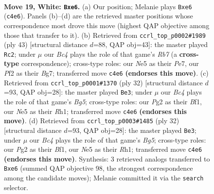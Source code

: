 \documentclass[11pt]{article}
\begin{document}
\clearpage

\begin{figure}[p]\centering
\begin{subfigure}{0.46\textwidth}\centering
\resizebox{\linewidth}{!}{%
\newchessgame
\chessboard[
  setfen={rn1r1k2/5pb1/2p1b3/4N1p1/p1B1nB1p/P7/RPP2PPP/1N2RK2 w - - 0 19},
  showmover=false,
  pgfstyle=straightmove, color=movearrow, markmove={c4-e6}
]}
\caption{}
\end{subfigure}\hfill
\begin{subfigure}{0.46\textwidth}\centering
\resizebox{\linewidth}{!}{%
\newchessgame
\chessboard[
  setfen={5rk1/4ppb1/p1npb2p/5P2/2p1P2B/2P5/Pr4P1/R1NNK2R b KQ - 1 22},
  showmover=false,
  pgfstyle=straightmove, color=movearrow, markmove={b2-c2}
]}
\caption{}
\end{subfigure}
\\[4pt]
\begin{subfigure}{0.46\textwidth}\centering
\resizebox{\linewidth}{!}{%
\newchessgame
\chessboard[
  setfen={r3k2r/1b1p2pp/p3p3/1p2n1B1/1b2P3/2N2P2/PPP3P1/2KR1B1R w kq - 1 17},
  showmover=false,
  pgfstyle=straightmove, color=movearrow, markmove={g5-e3}
]}
\caption{}
\end{subfigure}\hfill
\begin{subfigure}{0.46\textwidth}\centering
\resizebox{\linewidth}{!}{%
\newchessgame
\chessboard[
  setfen={r3k2r/1b1p2pp/p3p3/1p2n1B1/1b2P3/2N2P2/PPP3P1/2KR1B1R w kq - 1 17},
  showmover=false,
  pgfstyle=straightmove, color=movearrow, markmove={g5-e3}
]}
\caption{}
\end{subfigure}
\caption{\textbf{Move 19, White: \texttt{Bxe6}.} (a) Our position; Melanie plays \texttt{Bxe6} (\texttt{c4e6}). Panels (b)--(d) are the retrieved master positions whose correspondence most drove this move (highest QAP objective among those that transfer to it). (b) Retrieved from \texttt{ccrl\_top\_p0002\#1989} (ply 43) [structural distance $d$=88, QAP obj=43]: the master played \texttt{Rc2}; under $\mu$ our \emph{Bc4} plays the role of that game's \emph{Rb7} (a \textbf{cross-type} correspondence); cross-type roles: our \emph{N}e5 as their \emph{P}e7, our \emph{P}f2 as their \emph{B}g7; transferred move \texttt{c4e6} \textbf{(endorses this move)}. (c) Retrieved from \texttt{ccrl\_top\_p0001\#1370} (ply 32) [structural distance $d$=93, QAP obj=28]: the master played \texttt{Be3}; under $\mu$ our \emph{Bc4} plays the role of that game's \emph{Bg5}; cross-type roles: our \emph{P}g2 as their \emph{B}f1, our \emph{N}e5 as their \emph{R}h1; transferred move \texttt{c4e6} \textbf{(endorses this move)}. (d) Retrieved from \texttt{ccrl\_top\_p0003\#1485} (ply 32) [structural distance $d$=93, QAP obj=28]: the master played \texttt{Be3}; under $\mu$ our \emph{Bc4} plays the role of that game's \emph{Bg5}; cross-type roles: our \emph{P}g2 as their \emph{B}f1, our \emph{N}e5 as their \emph{R}h1; transferred move \texttt{c4e6} \textbf{(endorses this move)}. Synthesis: 3 retrieved analogs transferred to \texttt{Bxe6} (summed QAP objective 98, the strongest correspondence among the candidate moves); Melanie committed it via the \texttt{search} selector.}
\label{fig:thought-m36}
\end{figure}
\end{document}
